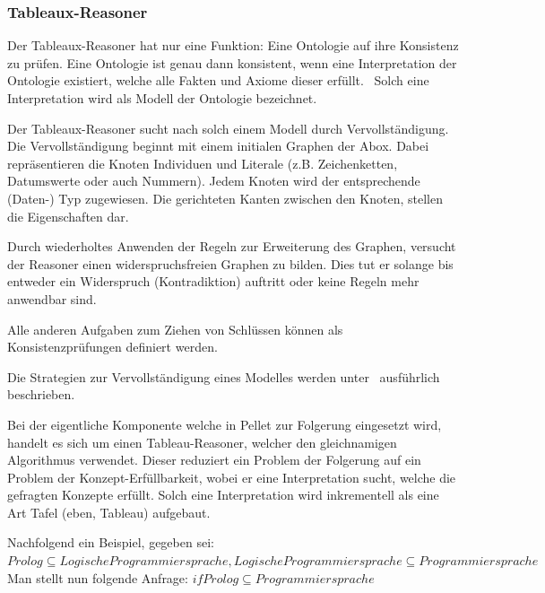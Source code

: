 \subsubsection{Tableaux-Reasoner}
\label{ssubsection:inferenz_pellet_tableaux}
Der Tableaux-Reasoner hat nur eine Funktion: Eine Ontologie auf ihre Konsistenz zu prüfen. Eine Ontologie ist genau dann konsistent, wenn eine Interpretation der Ontologie existiert, welche alle Fakten und Axiome dieser erfüllt.~\cite{w3owlsemantics} Solch eine Interpretation wird als Modell der Ontologie bezeichnet. 

Der Tableaux-Reasoner sucht nach solch einem Modell durch Vervollständigung. Die Vervollständigung beginnt mit einem initialen Graphen der Abox. Dabei repräsentieren die Knoten Individuen und Literale (z.B. Zeichenketten, Datumswerte oder auch Nummern). Jedem Knoten wird der entsprechende (Daten-) Typ zugewiesen. Die gerichteten Kanten zwischen den Knoten, stellen die Eigenschaften dar. 

Durch wiederholtes Anwenden der Regeln zur Erweiterung des Graphen, versucht der Reasoner einen widerspruchsfreien Graphen zu bilden. Dies tut er solange bis entweder ein Widerspruch (Kontradiktion) auftritt oder keine Regeln mehr anwendbar sind.

Alle anderen Aufgaben zum Ziehen von Schlüssen können als Konsistenzprüfungen definiert werden.

Die Strategien zur Vervollständigung eines Modelles werden unter~\cite[Seiten 7 bis 9]{sirin:pellet05} ausführlich beschrieben.


Bei der eigentliche Komponente welche in Pellet zur Folgerung eingesetzt wird, handelt es sich um einen Tableau-Reasoner, welcher den gleichnamigen Algorithmus verwendet. Dieser reduziert ein Problem der Folgerung auf ein Problem der Konzept-Erfüllbarkeit, wobei er eine Interpretation sucht, welche die gefragten Konzepte erfüllt. Solch eine Interpretation wird inkrementell als eine Art Tafel (eben, Tableau) aufgebaut.

Nachfolgend ein Beispiel, gegeben sei:
$ Prolog \subseteq LogischeProgrammiersprache, LogischeProgrammiersprache \subseteq Programmiersprache $
Man stellt nun folgende Anfrage:
$ if Prolog \subseteq Programmiersprache $

